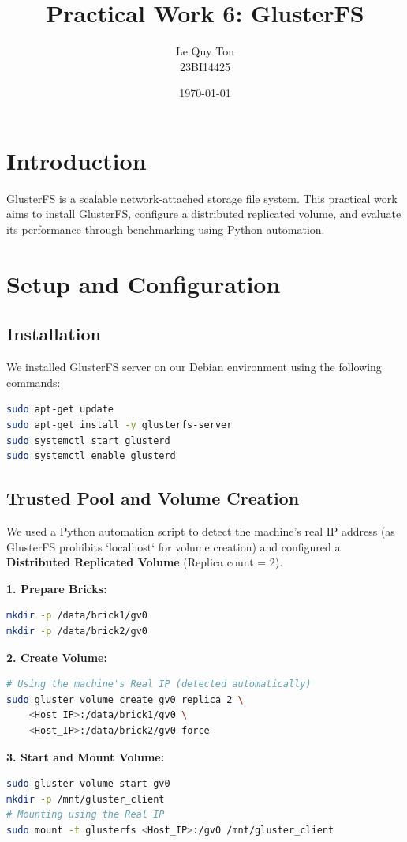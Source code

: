 \documentclass[a4paper,12pt]{article}
\title{Practical Work 6: GlusterFS}
\author{Le Quy Ton \\ 23BI14425}
\date{\today}
\begin{document}
\maketitle

\section{Introduction}
GlusterFS is a scalable network-attached storage file system. This practical work aims to install GlusterFS, configure a distributed replicated volume, and evaluate its performance through benchmarking using Python automation.

\section{Setup and Configuration}

\subsection{Installation}
We installed GlusterFS server on our Debian environment using the following commands:
\begin{lstlisting}[language=bash]
sudo apt-get update
sudo apt-get install -y glusterfs-server
sudo systemctl start glusterd
sudo systemctl enable glusterd
\end{lstlisting}

\subsection{Trusted Pool and Volume Creation}
We used a Python automation script to detect the machine's real IP address (as GlusterFS prohibits `localhost` for volume creation) and configured a \textbf{Distributed Replicated Volume} (Replica count = 2).

\textbf{1. Prepare Bricks:}
\begin{lstlisting}[language=bash]
mkdir -p /data/brick1/gv0
mkdir -p /data/brick2/gv0
\end{lstlisting}

\textbf{2. Create Volume:}
\begin{lstlisting}[language=bash]
# Using the machine's Real IP (detected automatically)
sudo gluster volume create gv0 replica 2 \
    <Host_IP>:/data/brick1/gv0 \
    <Host_IP>:/data/brick2/gv0 force
\end{lstlisting}

\textbf{3. Start and Mount Volume:}
\begin{lstlisting}[language=bash]
sudo gluster volume start gv0
mkdir -p /mnt/gluster_client
# Mounting using the Real IP
sudo mount -t glusterfs <Host_IP>:/gv0 /mnt/gluster_client
\end{lstlisting}
\end{document}
